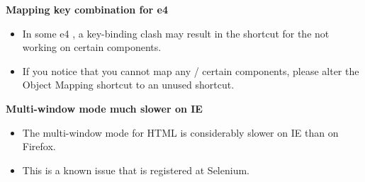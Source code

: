 \textbf{Mapping key combination for e4 \gdauts{}}
\begin{itemize}
\item In some e4 \gdauts{}, a key-binding clash may result in the shortcut for the \gdomm{} not working on certain components. 
\item If you notice that you cannot map any / certain components, please alter the Object Mapping shortcut to an unused shortcut. 
\end{itemize}

\textbf{Multi-window mode much slower on IE}
\begin{itemize}
\item The multi-window mode for HTML \gdauts{} is considerably slower on IE than on Firefox.
\item This is a known issue that is registered at Selenium. 
\end{itemize}
